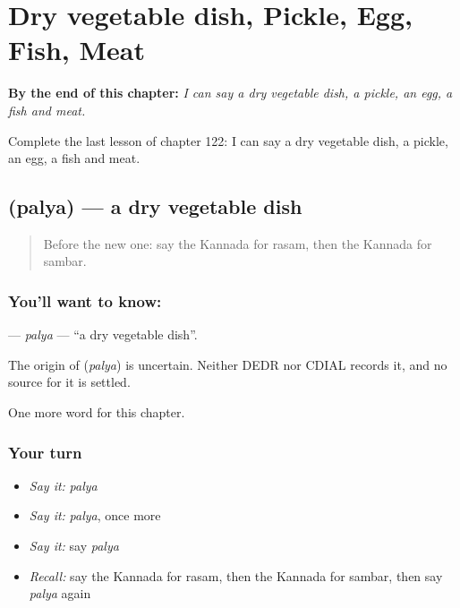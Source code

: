 
\chapter{Dry vegetable dish, Pickle, Egg, Fish, Meat}
\label{ch:ka-dry-vegetable-dish-pickle-egg-fish-meat}

\begin{chapteropening}
\textbf{By the end of this chapter:} \emph{I can say a dry vegetable dish, a pickle, an egg, a fish and meat.}

Complete the last lesson of chapter 122: I can say a dry vegetable dish, a pickle, an egg, a fish and meat.
\end{chapteropening}

\section[\texorpdfstring{\kn{ಪಲ್ಯ} (palya)}{ಪಲ್ಯ (palya)}]{ (palya) — a dry vegetable dish}

\label{lesson:KA-C122-palya}



\begin{quote}
Before the new one: say the Kannada for rasam, then the Kannada for sambar.
\end{quote}

\subsection*{You'll want to know: }
\textbf{} — \emph{palya} — \textquotedblleft{}a dry vegetable dish\textquotedblright{}.

\begin{cousinweb}
The origin of \textbf{} (\emph{palya}) is uncertain. Neither DEDR nor CDIAL records it, and no source for it is settled.
\end{cousinweb}

\begin{grammarlens}[title={What you've built}]
One more word for this chapter.
\end{grammarlens}

\subsection*{Your turn}
\begin{itemize}
\raggedright
  \item \emph{Say it:} \emph{palya}
  \item \emph{Say it:} \emph{palya}, once more
  \item \emph{Say it:} say \emph{palya}
  \item \emph{Recall:} say the Kannada for rasam, then the Kannada for sambar, then say \emph{palya} again
\end{itemize}

